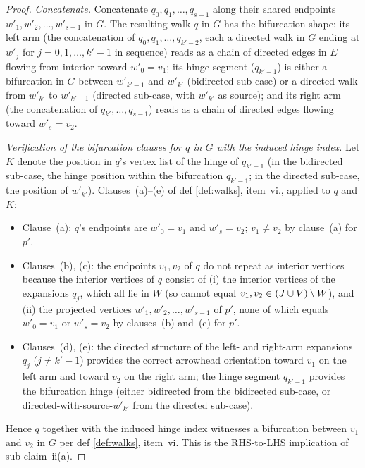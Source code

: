 \documentclass[main]{subfiles}
\begin{document}
\begin{proof}
\emph{Concatenate.}
Concatenate $q_0, q_1, \dots, q_{s-1}$ along their shared endpoints $w'_1, w'_2, \dots, w'_{s-1}$ in $G$. The resulting walk $q$ in $G$ has the bifurcation shape: its left arm (the concatenation of $q_0, q_1, \dots, q_{k'-2}$, each a directed walk in $G$ ending at $w'_j$ for $j = 0, 1, \dots, k'-1$ in sequence) reads as a chain of directed edges in $E$ flowing from interior toward $w'_0 = v_1$; its hinge segment ($q_{k'-1}$) is either a bifurcation in $G$ between $w'_{k'-1}$ and $w'_{k'}$ (bidirected sub-case) or a directed walk from $w'_{k'}$ to $w'_{k'-1}$ (directed sub-case, with $w'_{k'}$ as source); and its right arm (the concatenation of $q_{k'}, \dots, q_{s-1}$) reads as a chain of directed edges flowing toward $w'_s = v_2$.

\emph{Verification of the bifurcation clauses for $q$ in $G$ with the induced hinge index.}
Let $K$ denote the position in $q$'s vertex list of the hinge of $q_{k'-1}$ (in the bidirected sub-case, the hinge position within the bifurcation $q_{k'-1}$; in the directed sub-case, the position of $w'_{k'}$). Clauses~(a)--(e) of def \ref{def:walks}, item~vi., applied to $q$ and $K$:
\begin{itemize}
    \item Clause~(a): $q$'s endpoints are $w'_0 = v_1$ and $w'_s = v_2$; $v_1 \ne v_2$ by clause~(a) for $p'$.
    \item Clauses~(b), (c): the endpoints $v_1, v_2$ of $q$ do not repeat as interior vertices because the interior vertices of $q$ consist of (i) the interior vertices of the expansions $q_j$, which all lie in $W$ (so cannot equal $v_1, v_2 \in (J \cup V) \setminus W$), and (ii) the projected vertices $w'_1, w'_2, \dots, w'_{s-1}$ of $p'$, none of which equals $w'_0 = v_1$ or $w'_s = v_2$ by clauses~(b) and~(c) for $p'$.
    \item Clauses~(d), (e): the directed structure of the left- and right-arm expansions $q_j$ ($j \ne k' - 1$) provides the correct arrowhead orientation toward $v_1$ on the left arm and toward $v_2$ on the right arm; the hinge segment $q_{k'-1}$ provides the bifurcation hinge (either bidirected from the bidirected sub-case, or directed-with-source-$w'_{k'}$ from the directed sub-case).
\end{itemize}

Hence $q$ together with the induced hinge index witnesses a bifurcation between $v_1$ and $v_2$ in $G$ per def \ref{def:walks}, item~vi. This is the RHS-to-LHS implication of sub-claim~ii(a).


\end{proof}
\end{document}
